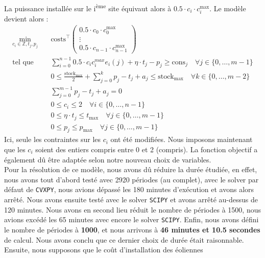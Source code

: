 \documentclass{article}
\begin{document}
\noindent La puissance installée sur le i\textsuperscript{ème} site équivaut alors à $0.5 \cdot c_i \cdot c_i^\mathrm{max}$. Le modèle devient alors :
\begin{align}
    \min_{c_{i} \in \mathbb{Z},t_j,p_j} \quad &\mathrm{costs}^\intercal 
    \begin{pmatrix}
        0.5 \cdot c_0 \cdot c_0^\mathrm{max}\\
        \vdots\\
        0.5 \cdot c_{n-1} \cdot c_{n-1}^\mathrm{max}
    \end{pmatrix} \nonumber\\
    \textrm{tel que} \quad & \sum_{i=0}^{n-1} 0.5 \cdot c_ic_i^{max} e_i(j) + \eta \cdot t_j - p_j \ge \mathrm{cons}_j \quad \forall j \in  \{ 0, \ldots, m-1 \}\label{eq:5_contr1}\\
    & 0 \le \frac{\mathrm{stock}_\mathrm{max}}{2}  + \sum_{j=0}^{k} p_j - t_j + a_j \le  \mathrm{stock}_\mathrm{max} \quad \forall k \in \{ 0, \ldots, m-2 \}\label{eq:5_contr2}\\
    & \sum_{j=0}^{m-1} p_j - t_j + a_j = 0 \label{eq:5_contr3}\\
    & 0\le c_i \le 2 \quad \forall i \in  \{ 0, \ldots, n-1 \} \label{eq:5_contr4}  \\
    & 0 \le \eta \cdot t_j \le  t_\mathrm{max} \quad \forall j \in  \{ 0, \ldots, m-1 \} \label{eq:5_contr5}\\
    & 0 \le p_j \le  p_\mathrm{max} \quad \forall j \in  \{ 0, \ldots, m-1 \} \label{eq:5_contr6} 
\end{align}
Ici, seule les contraintes sur les $c_i$ ont été modifiées. Nous imposons maintenant que les $c_i$ soient des entiers compris entre 0 et 2 (compris).
La fonction objectif a également dû être adaptée selon notre nouveau choix de variables.\\ 
Pour la résolution de ce modèle, nous avons dû réduire la durée étudiée, en effet, nous avons tout d'abord
testé avec 2920 périodes (au complet), avec le solver par défaut de \verb|CVXPY|, nous avions dépassé les 180 minutes
d'exécution et avons alors arrêté. Nous avons ensuite testé avec le solver \verb|SCIPY| et avons arrêté au-dessus de 120
minutes. Nous avons en second lieu réduit le nombre de périodes à 1500, nous avions excédé les 65
minutes avec encore le solver \verb|SCIPY|. Enfin, nous avons défini le nombre de périodes à \textbf{1000}, et nous arrivons
à \textbf{46 minutes et 10.5 secondes} de calcul. Nous avons conclu que ce dernier choix de durée était raisonnable.
Ensuite, nous supposons que le coût d'installation des éoliennes
\end{document}

